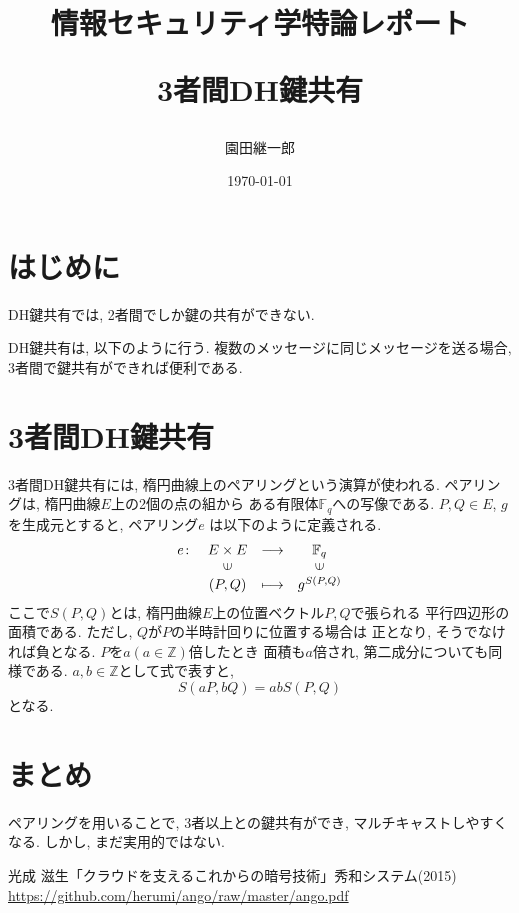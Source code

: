 \documentclass[a4paper,11pt]{jsarticle}
\begin{document}
\title{情報セキュリティ学特論レポート

3者間DH鍵共有}
\author{園田継一郎}
\date{\today}
\maketitle

\section{はじめに}
DH鍵共有では, 2者間でしか鍵の共有ができない.

DH鍵共有は, 以下のように行う.
複数のメッセージに同じメッセージを送る場合, 
3者間で鍵共有ができれば便利である.

\section{3者間DH鍵共有}
3者間DH鍵共有には, 楕円曲線上のペアリングという演算が使われる.
ペアリングは, 楕円曲線$E$上の2個の点の組から
ある有限体$\mathbb{F}_q$への写像である\cite{bib1}.
$P, Q \in E$, $g$を生成元とすると, ペアリング$e$
は以下のように定義される.
\[
  \begin{array}{rccc}
    e \colon & E \times E & \longrightarrow & \mathbb{F}_q \\
            & \rotatebox{90}{$\in$} & & \rotatebox{90}{$\in$} \\
            & (P, Q) & \longmapsto & g^{S(P, Q)}
  \end{array}
\]
ここで$S(P, Q)$とは, 楕円曲線$E$上の位置ベクトル$P, Q$で張られる
平行四辺形の面積である. ただし, $Q$が$P$の半時計回りに位置する場合は
正となり, そうでなければ負となる. $P$を$a (a\in \mathbb{Z})$倍したとき
面積も$a$倍され, 第二成分についても同様である.
$a, b \in \mathbb{Z}$として式で表すと, 
\[
  S(aP, bQ) = abS(P, Q)
\]
となる. 

\section{まとめ}
ペアリングを用いることで, 3者以上との鍵共有ができ,
マルチキャストしやすくなる.
しかし, まだ実用的ではない.

\begin{thebibliography}{99}
  光成 滋生「クラウドを支えるこれからの暗号技術」秀和システム(2015) \url{https://github.com/herumi/ango/raw/master/ango.pdf}
\end{thebibliography}
\end{document}
